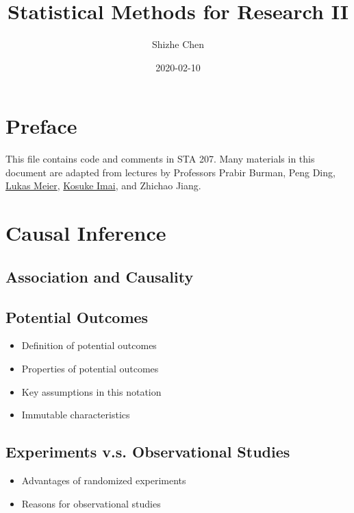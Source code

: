 \documentclass[12pt,]{book}
\title{Statistical Methods for Research II}
\author{Shizhe Chen}
\date{2020-02-10}
\providecommand{\tightlist}{%
  \setlength{\itemsep}{0pt}\setlength{\parskip}{0pt}}
\begin{document}
\maketitle

{
\setcounter{tocdepth}{1}
\tableofcontents
}
\chapter*{Preface}\label{pre}

This file contains code and comments in STA 207. Many materials in this
document are adapted from lectures by Professors Prabir Burman, Peng
Ding, \href{https://stat.ethz.ch/~meier/teaching/anova/}{Lukas Meier},
\href{https://imai.fas.harvard.edu/teaching/index.html}{Kosuke Imai},
and Zhichao Jiang.

\chapter{Causal Inference}\label{ch:causal}

\section{Association and Causality}\label{association-and-causality}

\section{Potential Outcomes}\label{potential-outcomes}

\begin{itemize}
\tightlist
\item
  Definition of potential outcomes
\item
  Properties of potential outcomes
\item
  Key assumptions in this notation
\item
  Immutable characteristics
\end{itemize}

\section{Experiments v.s. Observational
Studies}\label{experiments-v.s.-observational-studies}

\begin{itemize}
\tightlist
\item
  Advantages of randomized experiments
\item
  Reasons for observational studies
\end{itemize}
\end{document}
